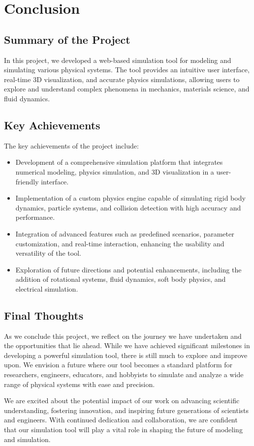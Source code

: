 \chapter{Conclusion}

\section{Summary of the Project}

In this project, we developed a web-based simulation tool for modeling and simulating various physical systems. The tool provides an intuitive user interface, real-time 3D visualization, and accurate physics simulations, allowing users to explore and understand complex phenomena in mechanics, materials science, and fluid dynamics.

\section{Key Achievements}

The key achievements of the project include:

\begin{itemize}
    \item Development of a comprehensive simulation platform that integrates numerical modeling, physics simulation, and 3D visualization in a user-friendly interface.
    \item Implementation of a custom physics engine capable of simulating rigid body dynamics, particle systems, and collision detection with high accuracy and performance.
    \item Integration of advanced features such as predefined scenarios, parameter customization, and real-time interaction, enhancing the usability and versatility of the tool.
    \item Exploration of future directions and potential enhancements, including the addition of rotational systems, fluid dynamics, soft body physics, and electrical simulation.
\end{itemize}

\section{Final Thoughts}

As we conclude this project, we reflect on the journey we have undertaken and the opportunities that lie ahead. While we have achieved significant milestones in developing a powerful simulation tool, there is still much to explore and improve upon. We envision a future where our tool becomes a standard platform for researchers, engineers, educators, and hobbyists to simulate and analyze a wide range of physical systems with ease and precision.

We are excited about the potential impact of our work on advancing scientific understanding, fostering innovation, and inspiring future generations of scientists and engineers. With continued dedication and collaboration, we are confident that our simulation tool will play a vital role in shaping the future of modeling and simulation.

